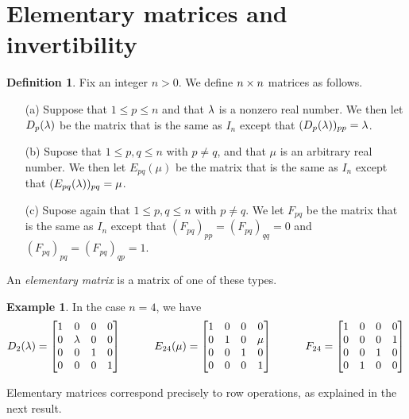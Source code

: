 \documentclass[reqno]{amsart}
\theoremstyle{definition}
\newtheorem{definition}[theorem]{Definition}
\newtheorem{example}[theorem]{Example}
\newcommand{\dfn}[1]{\emph{{#1}}\index{#1}}
\begin{document}
\section{Elementary matrices and invertibility}
\label{sec-elem}

\begin{definition}\label{defn-elementary}
 Fix an integer $n>0$.  We define $n\times n$ matrices as follows.
 \begin{itemize}
  \item[(a)] Suppose that $1\leq p\leq n$ and that $\lambda$ is a nonzero
   real number.  We then let $D_p(\lambda)$ be the matrix that is the same
   as $I_n$ except that $(D_p(\lambda))_{pp}=\lambda$.
  \item[(b)] Supose that $1\leq p,q\leq n$ with $p\neq q$, and that
   $\mu$ is an arbitrary real number.  We then let $E_{pq}(\mu)$ be
   the matrix that is the same as $I_n$ except that
   $(E_{pq}(\lambda))_{pq}=\mu$.
  \item[(c)] Supose again that $1\leq p,q\leq n$ with $p\neq q$.  We
   let $F_{pq}$ be the matrix that is the same as $I_n$ except that
   $(F_{pq})_{pp}=(F_{pq})_{qq}=0$ and $(F_{pq})_{pq}=(F_{pq})_{qp}=1$.
 \end{itemize}
 An \dfn{elementary matrix} is a matrix of one of these types.
\end{definition}

\begin{example}\label{eg-elementary}
 In the case $n=4$, we have
 \[
   D_2(\lambda) =
    \left[\begin{matrix}
     1 & 0 & 0 & 0 \\
     0 & \lambda & 0 & 0 \\
     0 & 0 & 1 & 0 \\
     0 & 0 & 0 & 1
    \end{matrix}\right]
   \hspace{3em}
   E_{24}(\mu) =
    \left[\begin{matrix}
     1 & 0 & 0 & 0 \\
     0 & 1 & 0 & \mu \\
     0 & 0 & 1 & 0 \\
     0 & 0 & 0 & 1
    \end{matrix}\right]
   \hspace{3em}
   F_{24} =
    \left[\begin{matrix}
     1 & 0 & 0 & 0 \\
     0 & 0 & 0 & 1 \\
     0 & 0 & 1 & 0 \\
     0 & 1 & 0 & 0
    \end{matrix}\right]
 \]
\end{example}

Elementary matrices correspond precisely to row operations, as
explained in the next result.
\end{document}
